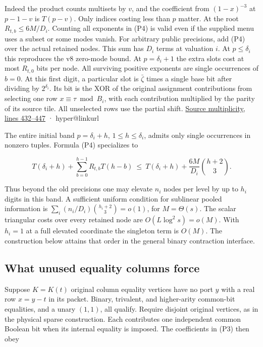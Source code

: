 \documentclass[
  11pt,
]{article}
\makeatletter
\newcommand{\PaperSixCatalogue}[1]{\csname hyper@linkurl\endcsname{#1}{EVIDENCE_CATALOG.md}}
\newcommand{\PaperSixEvidence}[2]{\PaperSixCatalogue{#2}}
\makeatother
\begin{document}
Indeed the product counts multisets by \(v\), and the coefficient from
\((1-x)^{-3}\) at \(p-1-v\) is \(T(p-v)\). Only indices costing less
than \(p\) matter. At the root \(R_{t,b}\le6M/D_i\). Counting all
exponents in (P4) is valid even if the supplied menu uses a subset or
some modes vanish. For arbitrary public precisions, add (P4) over the
actual retained nodes. This sum has \(D_i\) terms at valuation \(i\). At
\(p\le\delta_i\) this reproduces the v8 zero-mode bound. At
\(p=\delta_i+1\) the extra slots cost at most \(R_{t,0}\) bits per node.
All surviving positive exponents are single occurrences of \(b=0\). At
this first digit, a particular slot is \(\bar\zeta\) times a single base
bit after dividing by \(2^{\delta_i}\). Its bit is the XOR of the
original assignment contributions from selecting one row
\(x\equiv\tau\bmod B_i\), with each contribution multiplied by the
parity of its source tile. All unselected rows use the partial shift.
\href{https://github.com/openai/math/blob/main/preprints/The-Exponential-Time-Hypothesis-is-False-October-25-2026/build/quantitative-contraction.tex\#L432}{Source
multiplicity, lines 432--447} ·
\PaperSixEvidence{evidence/research_v8/applications/pooled_menu_barrier.md}{Prior
all-coordinate encoding}

The entire initial band \(p=\delta_i+h\), \(1\le h\le\delta_i\), admits
only single occurrences in nonzero tuples. Formula (P4) specializes to

\[
 T(\delta_i+h)+\sum_{b=0}^{h-1}R_{t,b}T(h-b)
 \ \le\ T(\delta_i+h)+\frac{6M}{D_i}\binom{h+2}{3}.
\]

Thus beyond the old precisions one may elevate \(n_i\) nodes per level
by up to \(h_i\) digits in this band. A sufficient uniform condition for
sublinear pooled information is
\(\sum_i (n_i/D_i)\binom{h_i+2}{3}=o(1)\), for \(M=\Theta(s)\). The
scalar triangular costs over every retained node are
\(O(L\log^2s)=o(M)\). With \(h_i=1\) at a full elevated coordinate the
singleton term is \(O(M)\). The construction below attains that order in
the general binary contraction interface.

\subsection{What unused equality columns
force}\label{v9-what-unused-equality-columns-force}

Suppose \(K=K(t)\) original column equality vertices have no port \(y\)
with a real row \(x=y-t\) in its packet. Binary, trivalent, and
higher-arity common-bit equalities, and a unary \((1,1)\), all qualify.
Require disjoint original vertices, as in the physical sparse
construction. Each contributes one independent common Boolean bit when
its internal equality is imposed. The coefficients in (P3) then obey
\end{document}
